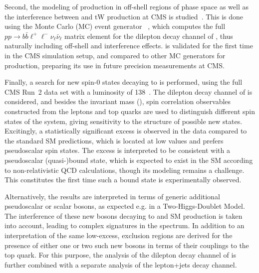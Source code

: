 
Second, the modeling of \ttbar production in off-shell regions of phase space as well as the interference between \ttbar and tW production at CMS is studied~\cite{CMS:NOTE-2023-015}. This is done using the Monte Carlo (MC) event generator \bbfourl~\cite{Jezo:2016ujg}, which computes the full $p p \rightarrow b \bar{b} \ell^+ \ell^- \nu_{\ell} \bar{\nu}_{\ell}$ matrix element for the dilepton decay channel of \ttbar, thus naturally including off-shell and interference effects. \bbfourl is validated for the first time in the CMS simulation setup, and compared to other MC generators for \ttbar production, preparing its use in future precision \ttbar measurements at CMS.


Finally, a search for new spin-0 states decaying to \ttbar is performed, using the full CMS Run~2 data set with a luminosity of \SI{138}{\fbinv}~\cite{CMS:HIG-22-013-PAS,CMS:TOP-24-007}. The dilepton decay channel of \ttbar is considered, and besides the invariant \ttbar mass (\mtt), spin correlation observables constructed from the leptons and top quarks are used to distinguish different spin states of the \ttbar system, giving sensitivity to the \CP structure of possible new states. Excitingly, a statistically significant excess is observed in the data compared to the standard SM predictions, which is located at low \mtt values and prefers pseudoscalar spin states. The excess is interpreted to be consistent with a pseudoscalar \ttbar (quasi-)bound state, which is expected to exist in the SM according to non-relativistic QCD calculations, though its modeling remains a challenge. This constitutes the first time such a \ttbar bound state is experimentally observed.

Alternatively, the results are interpreted in terms of generic additional pseudoscalar or scalar bosons, as expected e.g. in a Two-Higgs-Doublet Model. The interference of these new bosons decaying to \ttbar and SM \ttbar production is taken into account, leading to complex signatures in the \mtt spectrum. In addition to an interpretation of the same low-\mtt excess, exclusion regions are derived for the presence of either one or two such new bosons in terms of their couplings to the top quark. For this purpose, the analysis of the dilepton decay channel of \ttbar is further combined with a separate analysis of the lepton+jets decay channel.

